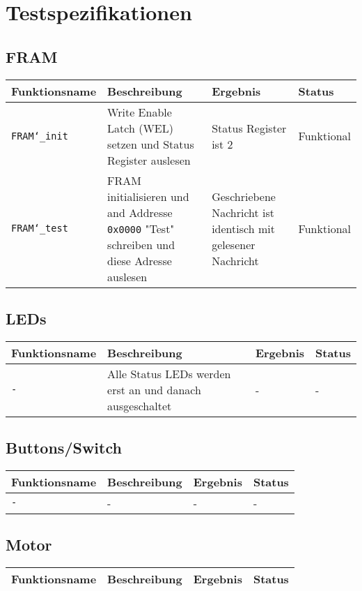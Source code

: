 \documentclass{article}
\begin{document}
	\section{Testspezifikationen}
	\subsection{FRAM}
		\begin{tabular}{|p{2.7cm}|p{5.5cm}|p{4cm}| p{1.6cm} |}
			\hline
				\textbf{Funktionsname} & \textbf{Beschreibung} & \textbf{Ergebnis} & \textbf{Status} \\
			\hline
				\texttt{FRAM\char`_init} & Write Enable Latch (WEL) setzen und Status Register auslesen & Status Register ist 2 & Funktional \\
			\hline
				\texttt{FRAM\char`_test} & FRAM initialisieren und and Addresse \texttt{0x0000} "Test" schreiben und diese Adresse auslesen & Geschriebene Nachricht ist identisch mit gelesener Nachricht & Funktional\\
			\hline
		\end{tabular}
	\subsection{LEDs}
		\begin{tabular}{|p{2.7cm}|p{5.5cm}|p{4cm}| p{1.6cm} |}
			\hline
				\textbf{Funktionsname} & \textbf{Beschreibung} & \textbf{Ergebnis} & \textbf{Status} \\
			\hline
				 \texttt{-} & Alle Status LEDs werden erst an und danach ausgeschaltet & - & - \\
			\hline
		\end{tabular}
		\subsection{Buttons/Switch}
	\begin{tabular}{|p{2.7cm}|p{5.5cm}|p{4cm}| p{1.6cm} |}
		\hline
			\textbf{Funktionsname} & \textbf{Beschreibung} & \textbf{Ergebnis} & \textbf{Status} \\
		\hline
			 \texttt{-} & - & - & - \\
		\hline
	\end{tabular}
	\subsection{Motor}
		\begin{tabular}{|p{2.7cm}|p{5.5cm}|p{4cm}| p{1.6cm} |}
			\hline
				\textbf{Funktionsname} & \textbf{Beschreibung} & \textbf{Ergebnis} & \textbf{Status} \\
			\hline
		\end{tabular}
\end{document}

